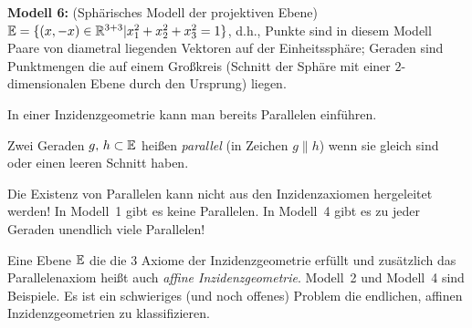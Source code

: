 \medskip


{\bf Modell 6:} (\glqq Sphärisches Modell der projektiven Ebene\grqq )\\
$\mathbb E=\{ (x,-x)\in\mathbb R^{3+3} | x_1^2+  x_2^2 + x_3^2= 1 \}$, d.h.,
Punkte sind in diesem Modell Paare von diametral liegenden Vektoren auf der
Einheitssphäre;
Geraden sind Punktmengen die auf einem Großkreis (Schnitt der Sphäre
mit einer $2$-dimensionalen Ebene durch den Ursprung) liegen.






\bigskip


In einer Inzidenzgeometrie kann man bereits Parallelen einführen.

\begin{defi}[Parallelit\"{a}t]
Zwei Geraden $g,\,h \subset \mathbb E$ heißen {\em parallel} (in Zeichen $g\|h$)
wenn sie gleich sind oder einen leeren Schnitt haben.
\end{defi}

Die Existenz von Parallelen kann nicht aus den Inzidenzaxiomen
hergeleitet werden! In Modell~1 gibt es keine Parallelen. In Modell~4
gibt es zu jeder Geraden unendlich viele Parallelen!







Eine Ebene $\mathbb E$ die die 3 Axiome der Inzidenzgeometrie erfüllt und
zusätzlich das Parallelenaxiom heißt auch {\em affine Inzidenzgeometrie}.
Modell~2 und Modell~4 sind Beispiele. Es ist ein schwieriges (und
noch offenes) Problem die endlichen, affinen Inzidenzgeometrien zu
klassifizieren.

